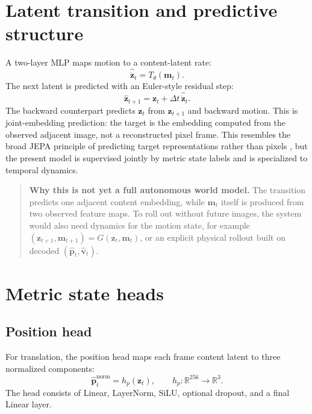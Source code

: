 \documentclass[11pt,a4paper]{article}
\newcommand{\R}{\mathbb{R}}\newcommand{\norm}[1]{\left\lVert #1\right\rVert}\newcommand{\E}{\mathbb{E}}\newcommand{\dt}{\Delta t}
\begin{document}
\section{Latent transition and predictive structure}
A two-layer MLP maps motion to a content-latent rate:
\begin{equation}
\widehat{\dot{\bm z}}_t=T_\theta(\bm m_t).
\end{equation}
The next latent is predicted with an Euler-style residual step:
\begin{equation}
\widehat{\bm z}_{t+1}=\bm z_t+\dt\,\widehat{\dot{\bm z}}_t.
\end{equation}
The backward counterpart predicts $\bm z_t$ from $\bm z_{t+1}$ and backward motion. This is joint-embedding prediction: the target is the embedding computed from the observed adjacent image, not a reconstructed pixel frame. This resembles the broad JEPA principle of predicting target representations rather than pixels \cite{assran2023ijepa}, but the present model is supervised jointly by metric state labels and is specialized to temporal dynamics.

\begin{quote}\textbf{Why this is not yet a full autonomous world model.} 
The transition predicts one adjacent content embedding, while $\bm m_t$ itself is produced from two observed feature maps. To roll out without future images, the system would also need dynamics for the motion state, for example $(\bm z_{t+1},\bm m_{t+1})=G(\bm z_t,\bm m_t)$, or an explicit physical rollout built on decoded $(\widehat{\bm p}_t,\widehat{\bm v}_t)$.
\end{quote}

\section{Metric state heads}
\subsection{Position head}
For translation, the position head maps each frame content latent to three normalized components:
\begin{equation}
\widehat{\bm p}^{\mathrm{norm}}_t=h_p(\bm z_t),\qquad h_p:\R^{256}\to\R^3.
\end{equation}
The head consists of Linear, LayerNorm, SiLU, optional dropout, and a final Linear layer.
\end{document}
